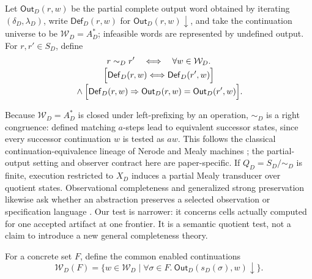 \documentclass[conference]{IEEEtran}
\begin{document}
Let $\mathsf{Out}_D(r,w)$ be the partial complete output word obtained by iterating $(\delta_D,\lambda_D)$, write $\mathsf{Def}_D(r,w)$ for $\mathsf{Out}_D(r,w)\downarrow$, and take the continuation universe to be $\mathcal W_D=A_D^*$; infeasible words are represented by undefined output. For $r,r'\in S_D$, define
\begin{equation}
\begin{gathered}
r\sim_D r'
\quad\Longleftrightarrow\quad
\forall w\in\mathcal W_D.\\[-1mm]
\Bigl[\mathsf{Def}_D(r,w)
\Longleftrightarrow
\mathsf{Def}_D(r',w)\Bigr]
\\[-1mm]
{}\land\Bigl[\mathsf{Def}_D(r,w)
\Rightarrow
\mathsf{Out}_D(r,w)=\mathsf{Out}_D(r',w)\Bigr].
\end{gathered}
\end{equation}

Because $\mathcal W_D=A_D^*$ is closed under left-prefixing by an operation, $\sim_D$ is a right congruence: defined matching $a$-steps lead to equivalent successor states, since every successor continuation $w$ is tested as $aw$. This follows the classical continuation-equivalence lineage of Nerode and Mealy machines \cite{ref22,ref23}; the partial-output setting and observer contract here are paper-specific. If $Q_D=S_D/{\sim_D}$ is finite, execution restricted to $X_D$ induces a partial Mealy transducer over quotient states. Observational completeness and generalized strong preservation likewise ask whether an abstraction preserves a selected observation or specification language \cite{ref24,ref25}. Our test is narrower: it concerns cells actually computed for one accepted artifact at one frontier. It is a semantic quotient test, not a claim to introduce a new general completeness theory.

For a concrete set $F$, define the common enabled continuations
\begin{equation}
\mathcal W_D(F)
=
\{w\in\mathcal W_D\mid
\forall\sigma\in F.\
\mathsf{Out}_D(s_D(\sigma),w)\downarrow\}.
\end{equation}
\end{document}
